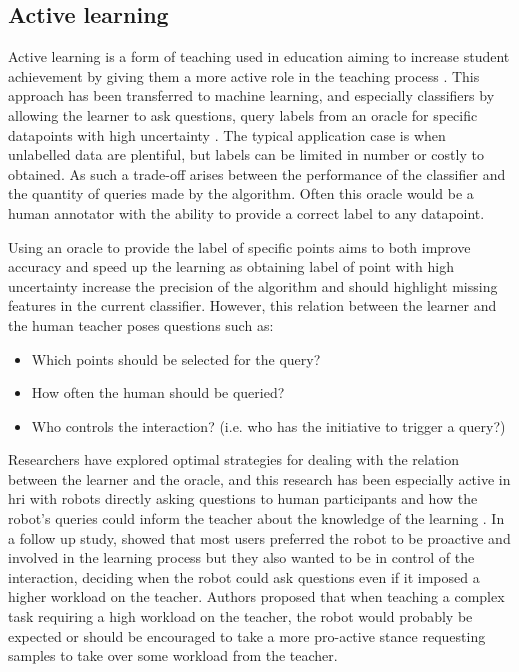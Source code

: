 \subsection{Active learning} \label{ssec:back_active}

Active learning is a form of teaching used in education aiming to increase student achievement by giving them a more active role in the teaching process \citep{johnson1991active}. This approach has been transferred to machine learning, and especially classifiers by allowing the learner to ask questions, query labels from an oracle for specific datapoints with high uncertainty \citep{settles2012active}. The typical application case is when unlabelled data are plentiful, but labels can be limited in number or costly to obtained. As such a trade-off arises between the performance of the classifier and the quantity of queries made by the algorithm. Often this oracle would be a human annotator with the ability to provide a correct label to any datapoint.

Using an oracle to provide the label of specific points aims to both improve accuracy and speed up the learning as obtaining label of point with high uncertainty increase the precision of the algorithm and should highlight missing features in the current classifier. However, this relation between the learner and the human teacher poses questions such as: 
\begin{itemize}
	\item Which points should be selected for the query?
	\item How often the human should be queried?
	\item Who controls the interaction? (i.e. who has the initiative to trigger a query?)
\end{itemize}

Researchers have explored optimal strategies for dealing with the relation between the learner and the oracle, and this research has been especially active in \gls{hri} with robots directly asking questions to human participants and how the robot's queries could inform the teacher about the knowledge of the learning \citep{chao2010transparent}. In a follow up study, \cite{cakmak2010designing} showed that most users preferred the robot to be proactive and involved in the learning process but they also wanted to be in control of the interaction, deciding when the robot could ask questions even if it imposed a higher workload on the teacher. Authors proposed that when teaching a complex task requiring a high workload on the teacher, the robot would probably be expected or should be encouraged to take a more pro-active stance requesting samples to take over some workload from the teacher.

